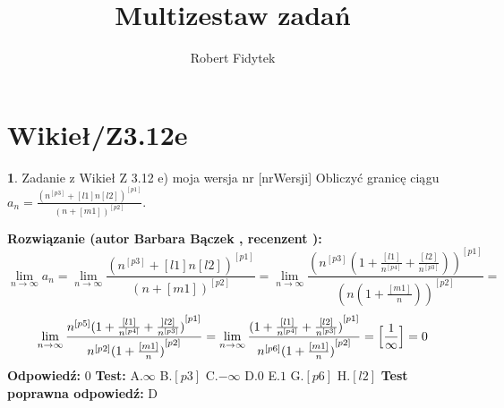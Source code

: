 \documentclass[12pt, a4paper]{article}
\title{Multizestaw zadań}
\author{Robert Fidytek}
\date{}
\theoremstyle{definition} %
\newtheorem{zad}{}
\newcommand{\kategoria}[1]{\section{#1}} %
\newcommand{\zadStart}[1]{\begin{zad}#1\newline} %
\newcommand{\zadStop}{\end{zad}}   %
\newcommand{\rozwStart}[2]{\noindent \textbf{Rozwiązanie (autor #1 , recenzent #2): }\newline} %
\newcommand{\rozwStop}{\newline}                                            %
\newcommand{\odpStart}{\noindent \textbf{Odpowiedź:}\newline}    %
\newcommand{\odpStop}{\newline}                                             %
\newcommand{\testStart}{\noindent \textbf{Test:}\newline} %
\newcommand{\testStop}{\newline} %
\newcommand{\kluczStart}{\noindent \textbf{Test poprawna odpowiedź:}\newline} %
\newcommand{\kluczStop}{\newline} %
\begin{document}
\maketitle


\kategoria{Wikieł/Z3.12e}
\zadStart{Zadanie z Wikieł Z 3.12 e) moja wersja nr [nrWersji]}
Obliczyć granicę ciągu $a_n=\frac{{(n^{[p3]} + [l1]n [l2])}^{[p1]}}{{(n+[m1])}^{[p2]}}$.
\zadStop
\rozwStart{Barbara Bączek}{}
$$\lim_{n \rightarrow \infty} a_n= \lim_{n \rightarrow \infty} \frac{{(n^{[p3]} + [l1]n [l2])}^{[p1]}}{{(n+[m1])}^{[p2]}}= \lim_{n \rightarrow \infty} \frac{{(n^{[p3]}(1+\frac{[l1]}{n^{[p4]}}+ \frac{[l2]}{n^{[p3]}}))}^{[p1]}}{{(n(1+ \frac{[m1]}{n}))}^{[p2]}} =$$
$$\lim_{n \rightarrow \infty} \frac{n^{[p5]}{(1+\frac{[l1]}{n^{[p4]}}+ \frac{]l2]}{n^{[p3]}})}^{[p1]}}{n^{[p2]}{(1+ \frac{[m1]}{n})}^{[p2]}}=\lim_{n \rightarrow \infty} \frac{{(1+\frac{[l1]}{n^{[p4]}}+ \frac{[l2]}{n^{[p3]}})}^{[p1]}}{n^{[p6]}{(1+ \frac{[m1]}{n})}^{[p2]}}= \Big{[}\frac{1}{\infty}\Big{]}=0$$ 
\rozwStop
\odpStart
$0$
\odpStop
\testStart
A.$\infty$
B.$[p3]$
C.$-\infty$
D.$0$
E.$1$
G.$[p6]$
H.$[l2]$
\testStop
\kluczStart
D
\kluczStop
\end{document}
